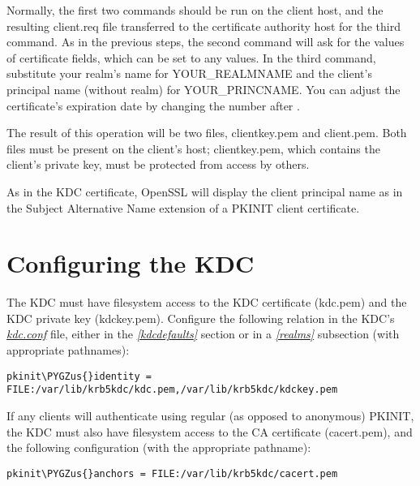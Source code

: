 \documentclass[letterpaper,10pt,english]{sphinxmanual}
\def\PYGZus{\char`\_}
\begin{document}
Normally, the first two commands should be run on the client host, and
the resulting client.req file transferred to the certificate authority
host for the third command.  As in the previous steps, the second
command will ask for the values of certificate fields, which can be
set to any values.  In the third command, substitute your realm's name
for YOUR\_REALMNAME and the client's principal name (without realm) for
YOUR\_PRINCNAME.  You can adjust the certificate's expiration date by
changing the number after .

The result of this operation will be two files, clientkey.pem and
client.pem.  Both files must be present on the client's host;
clientkey.pem, which contains the client's private key, must be
protected from access by others.

As in the KDC certificate, OpenSSL will display the client principal
name as  in the Subject Alternative Name
extension of a PKINIT client certificate.


\section{Configuring the KDC}
\label{admin/pkinit:configuring-the-kdc}
The KDC must have filesystem access to the KDC certificate (kdc.pem)
and the KDC private key (kdckey.pem).  Configure the following
relation in the KDC's {\hyperref[admin/conf_files/kdc_conf:kdc-conf-5]{\emph{kdc.conf}}} file, either in the
{\hyperref[admin/conf_files/kdc_conf:kdcdefaults]{\emph{{[}kdcdefaults{]}}}} section or in a {\hyperref[admin/conf_files/kdc_conf:kdc-realms]{\emph{{[}realms{]}}}} subsection (with
appropriate pathnames):

\begin{Verbatim}[commandchars=\\\{\}]
pkinit\PYGZus{}identity = FILE:/var/lib/krb5kdc/kdc.pem,/var/lib/krb5kdc/kdckey.pem
\end{Verbatim}

If any clients will authenticate using regular (as opposed to
anonymous) PKINIT, the KDC must also have filesystem access to the CA
certificate (cacert.pem), and the following configuration (with the
appropriate pathname):

\begin{Verbatim}[commandchars=\\\{\}]
pkinit\PYGZus{}anchors = FILE:/var/lib/krb5kdc/cacert.pem
\end{Verbatim}
\end{document}
